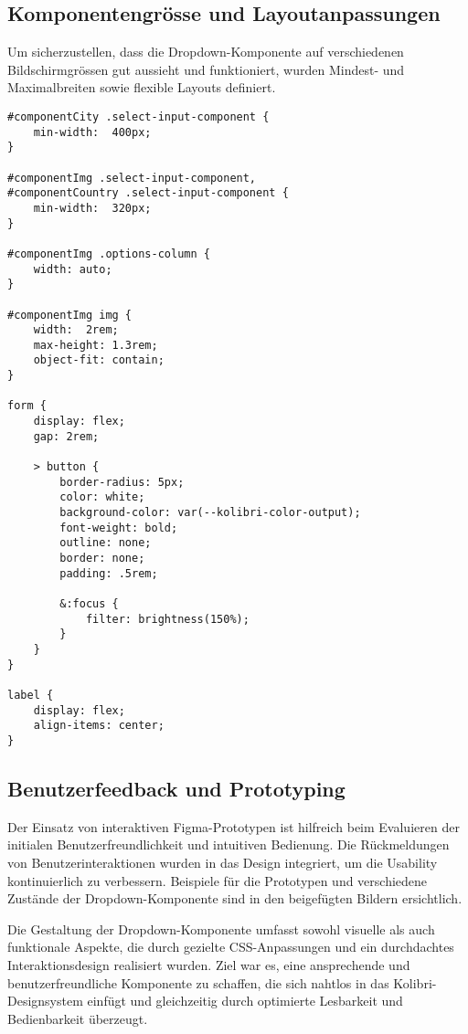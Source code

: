 \subsection{Komponentengrösse und Layoutanpassungen}

Um sicherzustellen, dass die Dropdown-Komponente auf verschiedenen Bildschirmgrössen gut aussieht und funktioniert, wurden Mindest- und Maximalbreiten sowie flexible Layouts definiert.

\begin{lstlisting}[style = htmlcssjs, caption = Flexible Layouts für Demo-Page, label = code:layoutDemoPage]
#componentCity .select-input-component {
    min-width:  400px;
}

#componentImg .select-input-component,
#componentCountry .select-input-component {
    min-width:  320px;
}

#componentImg .options-column {
    width: auto;
}

#componentImg img {
    width:  2rem;
    max-height: 1.3rem;
    object-fit: contain;
}

form {
    display: flex;
    gap: 2rem;

    > button {
        border-radius: 5px;
        color: white;
        background-color: var(--kolibri-color-output);
        font-weight: bold;
        outline: none;
        border: none;
        padding: .5rem;

        &:focus {
            filter: brightness(150%);
        }
    }
}

label {
    display: flex;
    align-items: center;
}
\end{lstlisting}


\subsection{Benutzerfeedback und Prototyping}

Der Einsatz von interaktiven Figma-Prototypen ist hilfreich beim Evaluieren der initialen Benutzerfreundlichkeit und intuitiven Bedienung. 
Die Rückmeldungen von Benutzerinteraktionen wurden in das Design integriert, um die Usability kontinuierlich zu verbessern. 
Beispiele für die Prototypen und verschiedene Zustände der Dropdown-Komponente sind in den beigefügten Bildern ersichtlich.

Die Gestaltung der Dropdown-Komponente umfasst sowohl visuelle als auch funktionale Aspekte, die durch gezielte CSS-Anpassungen und ein durchdachtes Interaktionsdesign realisiert wurden. 
Ziel war es, eine ansprechende und benutzerfreundliche Komponente zu schaffen, die sich nahtlos in das Kolibri-Designsystem einfügt und gleichzeitig durch optimierte Lesbarkeit und Bedienbarkeit überzeugt.


